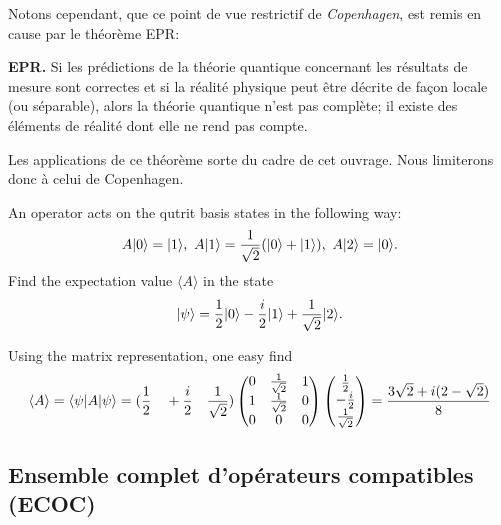 Notons cependant, que ce point de vue restrictif de \emph{Copenhagen}, est
remis en cause par le théorème EPR:

\medskip\colorbox[gray]{0.8}{
\parbox[c]{0.9\textwidth}{
\begin{theorem}
\textbf{EPR.} Si les prédictions de la théorie quantique concernant les
résultats de mesure sont correctes et si la réalité physique peut être décrite
de façon locale (ou séparable), alors la théorie quantique n'est pas complète;
il existe des {éléments de réalité} dont elle ne rend pas compte.
\end{theorem}
}}\medskip

Les applications de ce théorème sorte du cadre de cet ouvrage. Nous limiterons
donc à celui de Copenhagen.

\begin{exercise}
 An operator acts on the qutrit basis states in the following way:
\begin{equation}
 A\ket{0}=\ket{1},\ A\ket{1}=\frac{1}{\sqrt{2}}(\ket{0}+\ket{1}),\
A\ket{2}=\ket{0}.
\end{equation}
Find the expectation value $\langle A\rangle$ in the state
\begin{equation}
 \vert\psi\rangle=\frac{1}{2}\vert0\rangle-\frac{i}{2}\vert1\rangle+\frac{1}{\sqrt{2}}\vert2\rangle.
\end{equation}
\end{exercise}

\begin{footnotesize}
\begin{solution}
Using the matrix representation, one easy find
\begin{equation}
 \langle A\rangle=\langle\psi\vert A\vert\psi\rangle=(\frac{1}{2}\quad +\frac{i}{2}\quad
\frac{1}{\sqrt{2}})
\begin{pmatrix}
0 & \frac{1}{\sqrt{2}} & 1\\
1 & \frac{1}{\sqrt{2}} & 0\\
0 & 0 & 0
\end{pmatrix}
\begin{pmatrix}
\frac{1}{2}\\
-\frac{i}{2}\\
\frac{1}{\sqrt{2}}
\end{pmatrix}
=\frac{3\sqrt{2}+i(2-\sqrt{2})}{8}
\end{equation}
\end{solution}
\end{footnotesize}

\subsection{Ensemble complet d'opérateurs compatibles (ECOC)}

